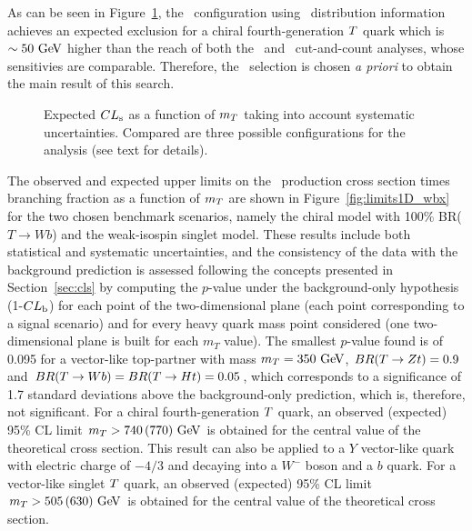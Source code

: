 As can be seen in Figure~\ref{fig:cls_study}, the \tight\ configuration using 
\mreco\ distribution information achieves an expected
exclusion for a chiral fourth-generation $\T$ quark which is $\sim 50\gev$ 
higher than the reach of both the
\loose\ and \tight\ cut-and-count analyses, whose sensitivies are comparable.
Therefore, the \tight\ selection is chosen 
{\it a priori} to obtain the main result of this search.

\begin{figure}[htb]\begin{center}
	\caption{Expected $CL_{\rm s}$ as a function of $m_{\T}$ taking into account systematic uncertainties.
Compared are three possible configurations for the analysis (see text for details).\label{fig:cls_study}}
\end{center}\end{figure}


The observed and expected upper limits on the \TTbar\ production cross section 
times branching fraction as a function of $m_{\T}$ are shown in 
Figure~\ref{fig:limits1D_wbx} for the two chosen benchmark scenarios,
namely the chiral model with 100\% BR($T\to Wb$) and the weak-isospin singlet 
model.
These results include both statistical and systematic uncertainties,
and the consistency of the data with the background prediction is 
assessed following the concepts presented in Section~\ref{sec:cls}
by computing the $p$-value under the background-only hypothesis
(1-$CL_{\rm b}$) for each point of the two-dimensional plane 
(each point corresponding to a signal scenario) and for every heavy 
quark mass point considered (one two-dimensional plane is built for each
$m_T$ value). The smallest $p$-value found is of 0.095 for a vector-like
top-partner with mass $m_{\T}=350\gev$, $BR(\T \to Zt)=0.9$ 
and $BR(\T \to Wb)=BR(\T \to Ht)=0.05$, which corresponds to a 
significance of 1.7 standard deviations above the 
background-only prediction, which is, therefore, not significant.
For a chiral fourth-generation $\T$ quark, an observed (expected) 95\%  CL  limit 
$m_{\T}>740\,(770)\gev$ is obtained for the central value of the 
theoretical cross section.
This result can also be applied to a $Y$ vector-like quark with electric charge of
$-4/3$ and decaying into a $W^-$ boson and a $b$ quark.
For a vector-like singlet $\T$ quark, an observed (expected) 95\%  CL  limit 
$m_{\T}>505\,(630)\gev$ is obtained for the central value of the 
theoretical cross section.

